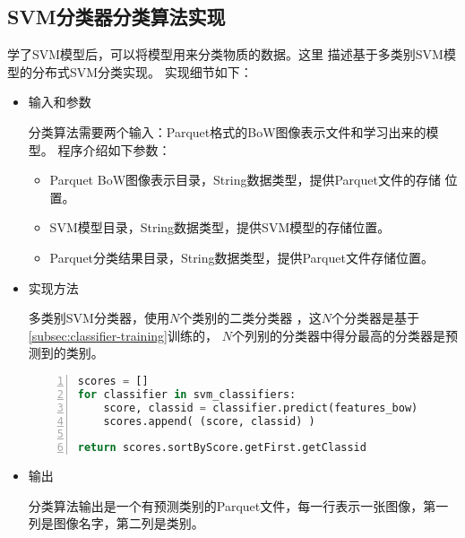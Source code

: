 \subsection{SVM分类器分类算法实现}
\label{subsec:classifier-label}
学了SVM模型后，可以将模型用来分类物质的数据。这里
描述基于多类别SVM模型的分布式SVM分类实现。
实现细节如下：
\begin{itemize}
  \item 输入和参数

        分类算法需要两个输入：Parquet格式的BoW图像表示文件和学习出来的模型。
        程序介绍如下参数：
        \begin{itemize}
            \item Parquet BoW图像表示目录，String数据类型，提供Parquet文件的存储
                  位置。
            \item SVM模型目录，String数据类型，提供SVM模型的存储位置。
            \item Parquet分类结果目录，String数据类型，提供Parquet文件存储位置。
        \end{itemize}

  \item 实现方法

        多类别SVM分类器，使用$N$个类别的二类分类器
        ，这$N$个分类器是基于\ref{subsec:classifier-training}训练的，
        $N$个列别的分类器中得分最高的分类器是预测到的类别。
        \begin{lstlisting}[language=Python,
                           basicstyle=\small,
                           numbers=left,
                           showstringspaces=false,
                           caption={SVM多类别分类器分类pseudocode},
                           label={lst:classifier-training}]
scores = []
for classifier in svm_classifiers:
    score, classid = classifier.predict(features_bow)
    scores.append( (score, classid) )

return scores.sortByScore.getFirst.getClassid

        \end{lstlisting}


  \item 输出

        分类算法输出是一个有预测类别的Parquet文件，每一行表示一张图像，第一列是图像名字，第二列是类别。
\end{itemize}






